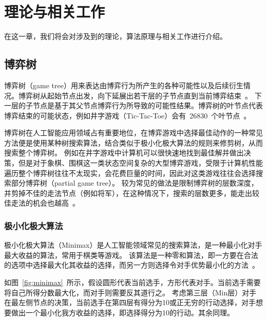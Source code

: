 \chapter{理论与相关工作}
\label{chap:theory}
在这一章，我们将会对涉及到的理论，算法原理与相关工作进行介绍。
\section{博弈树}
博弈树（game tree）用来表达由博弈行为所产生的各种可能性以及后续衍生情况。博弈树从起始节点出发，向下延展出若干层的子节点直到当前博弈结束~\cite{gt}。
下一层的子节点是基于其父节点博弈行为所导致的可能性结果。博弈树的叶节点代表博弈结束的可能状态，例如井字游戏（Tic-Tac-Toe）会有~26830~个叶节点~\cite{NAU1982257,allis1994searching}。


博弈树在人工智能应用领域占有重要地位，在博弈游戏中选择最佳动作的一种常见方法便是使用某种树搜索算法，结合类似于极小化极大算法的规则来修剪树，从而搜索整个博弈树。
例如在井字游戏中计算机可以很快速地找到最佳解并做出决策，但是对于象棋、围棋这一类状态空间复杂的大型博弈游戏，受限于计算机性能遍历整个博弈树往往不太现实，会花费巨量的时间，因此对这类游戏往往会选择搜索部分博弈树（partial game tree）。
较为常见的做法是限制博弈树的层数深度，并剪掉不佳的走法节点（例如将军），在这种情况下，搜索的层数更多，能走出较佳走法的机会也越高~\cite{coin12162}。

\subsection{极小化极大算法}
极小化极大算法（Minimax）是人工智能领域常见的搜索算法，是一种最小化对手最大收益的算法，常用于棋类等游戏。
该算法是一种零和算法，即一方要在合法的选项中选择最大化其收益的选择，而另一方则选择令对手优势最小化的方法~\cite{ctt1r2gkx}。


如图~\ref{fig:minimax}~所示，假设圆形代表当前选手，方形代表对手。当前选手需要将自己所得分数最大化，而对手则需要反其道行之。
考虑第三层（Min层）对手在最左侧节点的决策，当前选手在第四层有得分为10或正无穷的行动选择，对手想要做出一个最小化我方收益的选择，即选择得分为10的行动。其余同理。
